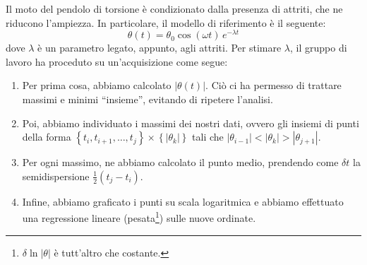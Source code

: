 \documentclass{article}
\begin{document}
Il moto del pendolo di torsione è condizionato dalla presenza
di attriti, che ne riducono l'ampiezza. In particolare, il modello
di riferimento è il seguente:
\[\theta(t) = \theta_0\cos(\omega t)\,e^{-\lambda t}\]
dove $\lambda$ è un parametro legato, appunto, agli attriti.
Per stimare $\lambda$, il gruppo di lavoro ha proceduto
su un'acquisizione come segue:
\begin{enumerate}
    \item
        Per prima cosa, abbiamo calcolato $\left|\theta(t)\right|$.
        Ciò ci ha permesso di trattare massimi e minimi “insieme”,
        evitando di ripetere l'analisi.
    \item
        Poi, abbiamo individuato i massimi dei nostri dati, ovvero
        gli insiemi di punti della forma
        $\left\{t_i,t_{i+1},\dots,t_j\right\}\times\left\{\left|\theta_k\right|\right\}$
        tali che $\left|\theta_{i-1}\right| < \left|\theta_k\right| > \left|\theta_{j+1}\right|$.
    \item
        Per ogni massimo, ne abbiamo calcolato il punto medio,
        prendendo come $\delta t$ la semidispersione $\frac{1}{2}(t_j - t_i)$.
    \item
        Infine, abbiamo graficato i punti su scala logaritmica e
        abbiamo effettuato una regressione lineare (pesata\footnote{
            $\delta\ln{\left|\theta\right|}$ è tutt'altro che costante.
        })
        sulle nuove ordinate.
\end{enumerate}
\end{document}
